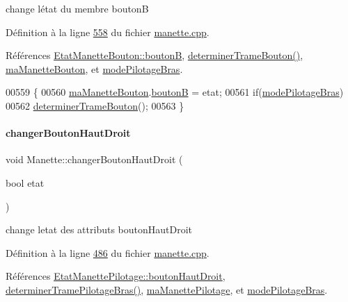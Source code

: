 change l\textquotesingle{}état du membre boutonB 



Définition à la ligne \hyperlink{manette_8cpp_source_l00558}{558} du fichier \hyperlink{manette_8cpp_source}{manette.\+cpp}.



Références \hyperlink{manette_8h_source_l00125}{Etat\+Manette\+Bouton\+::boutonB}, \hyperlink{manette_8cpp_source_l00393}{determiner\+Trame\+Bouton()}, \hyperlink{manette_8h_source_l00215}{ma\+Manette\+Bouton}, et \hyperlink{manette_8h_source_l00254}{mode\+Pilotage\+Bras}.


\begin{DoxyCode}
00559 \{
00560     \hyperlink{class_manette_ae69fd9baa0dad8a960fa93611b6a185f}{maManetteBouton}.\hyperlink{struct_etat_manette_bouton_a2a0f4d809b1b9b814fa689113becaad7}{boutonB} = etat;
00561     \textcolor{keywordflow}{if}(\hyperlink{class_manette_acc2cd9afa45328c0da5c580e5c1a67db}{modePilotageBras})
00562         \hyperlink{class_manette_a3fb9d1245400b6bb6379fbb63a8099ba}{determinerTrameBouton}();
00563 \}
\end{DoxyCode}
\mbox{\label{class_manette_a039b73883b0649e1bbaa7f7b3dff43f8}} 
\paragraph{\texorpdfstring{changer\+Bouton\+Haut\+Droit}{changerBoutonHautDroit}}
{\footnotesize\ttfamily void Manette\+::changer\+Bouton\+Haut\+Droit (\begin{DoxyParamCaption}\item[{bool}]{etat }\end{DoxyParamCaption})\hspace{0.3cm}{\ttfamily [slot]}}



change l\textquotesingle{}etat des attributs bouton\+Haut\+Droit 



Définition à la ligne \hyperlink{manette_8cpp_source_l00486}{486} du fichier \hyperlink{manette_8cpp_source}{manette.\+cpp}.



Références \hyperlink{manette_8h_source_l00157}{Etat\+Manette\+Pilotage\+::bouton\+Haut\+Droit}, \hyperlink{manette_8cpp_source_l00375}{determiner\+Trame\+Pilotage\+Bras()}, \hyperlink{manette_8h_source_l00246}{ma\+Manette\+Pilotage}, et \hyperlink{manette_8h_source_l00254}{mode\+Pilotage\+Bras}.


